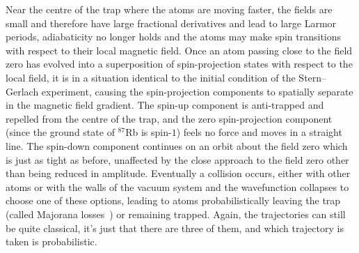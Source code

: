 Near the centre of the trap where the atoms are moving faster, the fields are small and therefore have large fractional derivatives and lead to large Larmor periods, adiabaticity no longer holds and the atoms may make spin transitions with respect to their local magnetic field. Once an atom passing close to the field zero has evolved into a superposition of spin-projection states with respect to the local field, it is in a situation identical to the initial condition of the Stern--Gerlach experiment, causing the spin-projection components to spatially separate in the magnetic field gradient. The spin-up component is anti-trapped and repelled from the centre of the trap, and the zero spin-projection component (since the ground state of $^{87}$Rb is spin-$1$) feels no force and moves in a straight line. The spin-down component continues on an orbit about the field zero which is just as tight as before, unaffected by the close approach to the field zero other than being reduced in amplitude. Eventually a collision occurs, either with other atoms or with the walls of the vacuum system and the wavefunction collapses to choose one of these options, leading to atoms probabilistically leaving the trap (called Majorana losses~\cite{Majorana1932, PhysRevLett.74.3352}) or remaining trapped. Again, the trajectories can still be quite classical, it's just that there are three of them, and which trajectory is taken is probabilistic.

